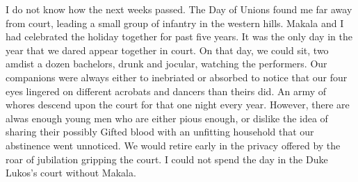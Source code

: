 \documentclass{article}
\begin{document}
\begin{comment}
It was an old answer. It did not adress my jealousy. "There are other Gifted from powerful families from the north. Of all the wives you could have chosen, why did you chose one with whom you share a fondness? I could have taken you leaving me for a stranger."

I heard the smile in his responce. "Or better yet, a woman I despise. Would it make you happy to see me as miserable in my marriage as you are in daily life?"

Yes, I thought silently, though I did not mean it. I would never wish him ill, even when I could not stand to see him. I said nothing. 

He changed the subject. "I do think you should attend the celebrations here. You could marry."

I broke free from him in my surprise. For Makala to marry was cruelty and madness. He had a sound, legitimate reason why he had to undergo it, but it would drive us both out of our heads. For me to undergo the same, for no reason at all, was senseless violence upon my person. I stared at him and composed myself. It must be grief that caused him to suggest this. There was no other explanation. I tried to make light of the comment. "What woman would I be able to hoodwink into uniting with a miscast like me?"

My attempt at humor failed. Makala's dark lips curled sadly upwards on the right side of his face. "You did not have to hoodwink the duke's son. His young captain can find a wife." He kissed me. "Dress now. My guard will be at the door soon." 

I felt ashamed. I had not wanted our last night to end like this. "Consider it, as a favour to me," he said as I positioned my weapons on my person. I nodded. I would not, but neither would I voice that lie. "Will you see me off tomorrow morning?" he asked I put my hand on the door.

I turned to face him, forcing myself to smile. "I will be in the honor guard, my liege." I said, and bowed. "I will watch from the east tower until I can no longer see the dust of your trail."

That promise, at least, I kept. 
***
\end{comment}

I do not know how the next weeks passed. The Day of Unions found me far away from court, leading a small group of infantry in the western hills. Makala and I had celebrated the holiday together for past five years. It was the only day in the year that we dared appear together in court. On that day, we could sit, two amdist a dozen bachelors, drunk and jocular, watching the performers. Our companions were always either to inebriated or absorbed to notice that our four eyes lingered on different acrobats and dancers than theirs did. An army of whores descend upon the court for that one night every year. However, there are alwas enough young men who are either pious enough, or dislike the idea of sharing their possibly Gifted blood with an unfitting household that our abstinence went unnoticed. We would retire early in the privacy offered by the roar of jubilation gripping the court. I could not spend the day in the Duke Lukos's court without Makala.
\end{document}
